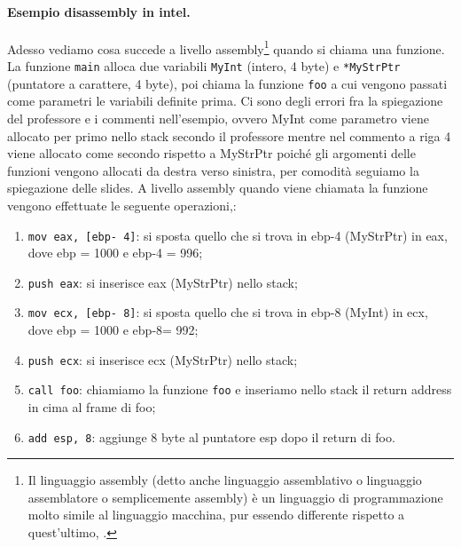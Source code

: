 \paragraph{Esempio disassembly in intel.} Adesso vediamo cosa succede a livello assembly\footnote{Il linguaggio assembly (detto anche linguaggio assemblativo o linguaggio assemblatore o semplicemente assembly) è un linguaggio di programmazione molto simile al linguaggio macchina, pur essendo differente rispetto a quest'ultimo, \cite{itwiki:125849812}.} quando si chiama una funzione. La funzione \verb|main| alloca due variabili \verb|MyInt| (intero, 4 byte) e \verb|*MyStrPtr| (puntatore a carattere, 4 byte), poi chiama la funzione \verb|foo| a cui vengono passati come parametri le variabili definite prima. Ci sono degli errori fra la spiegazione del professore e i commenti nell'esempio, ovvero MyInt come parametro viene allocato per primo nello stack secondo il professore mentre nel commento a riga 4 viene allocato come secondo rispetto a MyStrPtr poiché gli argomenti delle funzioni vengono allocati da destra verso sinistra, per comodità seguiamo la spiegazione delle slides.  A livello assembly quando viene chiamata la funzione vengono effettuate le seguente operazioni,:
\begin{enumerate}
    \item  \verb|mov eax, [ebp- 4]|: si sposta quello che si trova in ebp-4 (MyStrPtr) in eax, dove ebp = 1000 e ebp-4 = 996;
    \item \verb|push eax|: si inserisce eax (MyStrPtr) nello stack;
    \item  \verb|mov ecx, [ebp- 8]|: si sposta quello che si trova in ebp-8 (MyInt) in ecx,  dove ebp = 1000 e ebp-8= 992;
    \item \verb|push ecx|: si inserisce ecx (MyStrPtr) nello stack;
    \item \verb|call foo|: chiamiamo la funzione \verb|foo| e inseriamo nello stack il return address in cima al frame di foo;
    \item \verb|add esp, 8|: aggiunge 8 byte al puntatore esp dopo il return di foo.
\end{enumerate}

